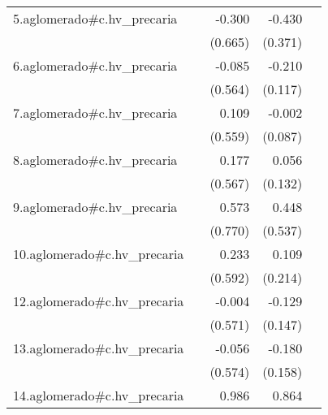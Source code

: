{\begin{longtable}{l*{4}{D{.}{.}{-1}}}
\addlinespace
5.aglomerado#c.hv\_precaria&                     &      -0.300         &      -0.430         &                     \\
            &                     &     (0.665)         &     (0.371)         &                     \\
\addlinespace
6.aglomerado#c.hv\_precaria&                     &      -0.085         &      -0.210         &                     \\
            &                     &     (0.564)         &     (0.117)         &                     \\
\addlinespace
7.aglomerado#c.hv\_precaria&                     &       0.109         &      -0.002         &                     \\
            &                     &     (0.559)         &     (0.087)         &                     \\
\addlinespace
8.aglomerado#c.hv\_precaria&                     &       0.177         &       0.056         &                     \\
            &                     &     (0.567)         &     (0.132)         &                     \\
\addlinespace
9.aglomerado#c.hv\_precaria&                     &       0.573         &       0.448         &                     \\
            &                     &     (0.770)         &     (0.537)         &                     \\
\addlinespace
10.aglomerado#c.hv\_precaria&                     &       0.233         &       0.109         &                     \\
            &                     &     (0.592)         &     (0.214)         &                     \\
\addlinespace
12.aglomerado#c.hv\_precaria&                     &      -0.004         &      -0.129         &                     \\
            &                     &     (0.571)         &     (0.147)         &                     \\
\addlinespace
13.aglomerado#c.hv\_precaria&                     &      -0.056         &      -0.180         &                     \\
            &                     &     (0.574)         &     (0.158)         &                     \\
\addlinespace
14.aglomerado#c.hv\_precaria&                     &       0.986         &       0.864\sym{*}  &                     \\

\end{longtable}}
